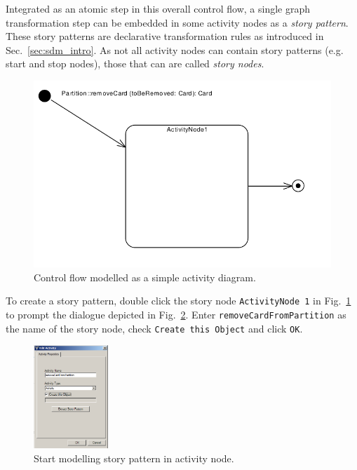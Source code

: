 \label{story-pattern}

Integrated as an atomic step in this overall control flow, a single graph
transformation step can be embedded in some activity nodes as a \emph{story
pattern}.  These story patterns are declarative transformation rules as introduced in
Sec.~\ref{sec:sdm_intro}.  As not all activity nodes can contain story
patterns (e.g. start and stop nodes), those that can are called \emph{story
nodes}. \clearpage


\begin{figure}[htp]
\begin{center}
  \includegraphics[width=\textwidth]{pics/sdmBilder/removeCard/sdm06RAW.pdf}
  \caption{Control flow modelled as a simple activity diagram.}  
  \label{fig:sdm_complete_control_flow_simple}
\end{center}
\end{figure}

To create a story pattern, double click the story node \texttt{ActivityNode 1}
in Fig.~\ref{fig:sdm_complete_control_flow_simple} to prompt the dialogue
depicted in Fig.~\ref{fig:story_pattern}.  Enter
\texttt{remove\-Card\-From\-Partition} as the name of the story node, check
\texttt{Create this Object} and click \texttt{OK}.

\begin{figure}[hbp]
\begin{center} 
  \includegraphics[width=0.25\textwidth]{pics/sdmBilder/removeCard/sdm07RAW}
  \caption{Start modelling story pattern in activity node.}  
  \label{fig:story_pattern}
\end{center}
\end{figure}


